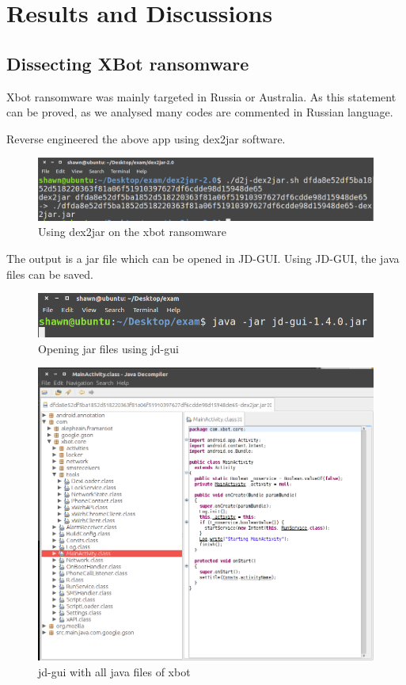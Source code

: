 \chapter{Results and Discussions}

\section{Dissecting XBot ransomware}

Xbot ransomware was mainly targeted in Russia or Australia.
As this statement can be proved, as we analysed many codes are commented in Russian language.

Reverse engineered the above app using dex2jar software.

\begin{figure}[H]
\centering
\includegraphics[scale=0.3]{dex2jar}
\caption{Using dex2jar on the xbot ransomware}
\label{fig:ra}
\end{figure}

The output is a jar file which can be opened in JD-GUI.
Using JD-GUI, the java files can be saved.

\begin{figure}[H]
\centering
\includegraphics[scale=0.5]{jd-gui1}
\caption{Opening jar files using jd-gui}
\label{fig:ra}
\end{figure}

\begin{figure}[H]
\centering
\includegraphics[scale=0.3]{jd-gui2}
\caption{jd-gui with all java files of xbot}
\label{fig:ra}
\end{figure}


